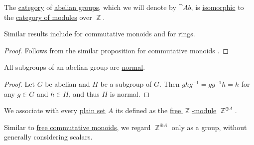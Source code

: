 \begin{proposition}\label{thm:category_of_abelian_groups}
  The \hyperref[def:category]{category} of \hyperref[def:abelian_group]{abelian groups}, which we will denote by \( \cat{Ab} \), is \hyperref[rem:category_similarity/isomorphism]{isomorphic} to the \hyperref[def:module/category]{category of modules} over \( \BbbZ \).
\end{proposition}
\begin{comments}
  \item Similar results include  for commutative monoids and  for rings.
\end{comments}
\begin{proof}
  Follows from the similar proposition for commutative monoids .
\end{proof}

\begin{proposition}\label{thm:abelian_normal_subgroups}
  All subgroups of an abelian group are \hyperref[def:normal_subgroup]{normal}.
\end{proposition}
\begin{proof}
  Let \( G \) be abelian and \( H \) be a subgroup of \( G \). Then \( g h g^{-1} = gg^{-1} h = h \) for any \( g \in G \) and \( h \in H \), and thus \( H \) is normal.
\end{proof}

\begin{definition}\label{def:free_abelian_group}\mimprovised
  We associate with every \hyperref[def:set]{plain set} \( A \) its  defined as the \hyperref[def:free_semimodule]{free \( \BbbZ \)-module} \( \BbbZ^{\oplus A} \).
\end{definition}
\begin{comments}
  \item Similar to \hyperref[def:free_commutative_monoid]{free commutative monoids}, we regard \( \BbbZ^{\oplus A} \) only as a group, without generally considering scalars.
\end{comments}

